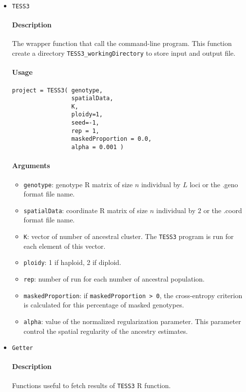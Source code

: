 \documentclass[10pt,a4paper]{article}
\begin{document}
\begin{itemize}

\item \verb|TESS3|

\paragraph{Description}
The wrapper function that call the command-line program. This function create a directory \verb|TESS3_workingDirectory| to store input and output file.
\paragraph{Usage}
\begin{Verbatim}
project = TESS3( genotype,
                 spatialData,
                 K,
                 ploidy=1,
                 seed=-1, 
                 rep = 1, 
                 maskedProportion = 0.0, 
                 alpha = 0.001 )
\end{Verbatim}
\paragraph{Arguments}
\begin{itemize}
\item \verb|genotype|: genotype R matrix of size $n$ individual by $L$ loci or the .geno format file name.
\item \verb|spatialData|: coordinate R matrix of size $n$ individual by $2$ or the .coord format file name.
\item \verb|K|: vector of number of ancestral cluster. The {\tt TESS3} program is run for each element of this vector.
\item \verb|ploidy|: 1 if haploid, 2 if diploid.
\item \verb|rep|: number of run for each number of ancestral population.
\item \verb|maskedProportion|: if \verb|maskedProportion > 0|, the cross-entropy criterion is calculated for this percentage of masked genotypes.
\item \verb|alpha|: value of the normalized regularization parameter. This parameter control the spatial regularity of the ancestry estimates.
\end{itemize}

\item \verb|Getter|

\paragraph{Description}
Functions useful to fetch results of \verb|TESS3| R function.

\end{itemize}
\end{document}
